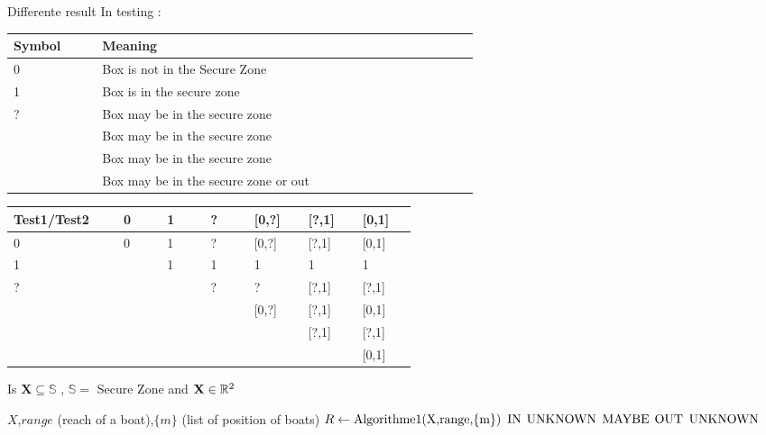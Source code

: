 \documentclass[10pt,a4paper]{report}
\begin{document}
Differente result In testing : \newline

\begin{center}
\begin{tabular}{|m{0.10\linewidth}|m{0.5\linewidth}|}
\hline
 Symbol & Meaning  \\ \hline
 0 & Box is not in the Secure Zone  \\ \hline
 1 &  Box is in the secure zone \\ \hline
 ? &  Box may be in the secure zone  \\ \hline
[0,?] & Box may be in the secure zone \\ \hline
[?,1] & Box may be in the secure zone\\ \hline
[0,1] & Box may be in the secure zone or out \\ \hline
    
   
\end{tabular}
\end{center}


\begin{center}
\begin{tabular}{|m{0.10\linewidth}|m{0.07\linewidth}|m{0.07\linewidth}|m{0.07\linewidth}|m{0.07\linewidth}|m{0.07\linewidth}|m{0.07\linewidth}|}
\hline
Test1/Test2 & 0 & 1 & ? & [0,?] &  [?,1] & [0,1] \\ \hline
          0 & 0 & 1 & ? & [0,?] &  [?,1] & [0,1]  \\ \hline
          1 &   & 1 & 1 &   1   &    1   &   1  \\ \hline
          ? &   &   & ? &   ?   &  [?,1] & [?,1] \\ \hline
      [0,?] &   &   &   & [0,?] &  [?,1] & [0,1] \\ \hline
      [?,1] &   &   &   &       &  [?,1] & [?,1] \\ \hline
      [0,1] &   &   &   &       &        & [0,1]  \\ \hline
    
   
\end{tabular}
\end{center}

\begin{algorithm}
\caption{Is $\mathbf{X} \subseteq \mathbb{S}$ , $\mathbb{S} =$ Secure Zone and $\mathbf{X} \in \mathbb{R^{\textnormal{\ensuremath{2}}}}$ }
\begin{algorithmic}
\REQUIRE $X$,$range $ (reach of a boat),$\{m\}$ (list of position of boats)
\STATE $R \leftarrow \textnormal{Algorithme1(X,range,\{m\})}$
\RETURN $\textnormal{IN}$
\RETURN $\textnormal{UNKNOWN}$
\RETURN $\textnormal{MAYBE}$
\RETURN $\textnormal{OUT}$
\ELSE
\RETURN $\textnormal{UNKNOWN}$
\ENDIF
\end{algorithmic}
\end{algorithm}
\end{document}
